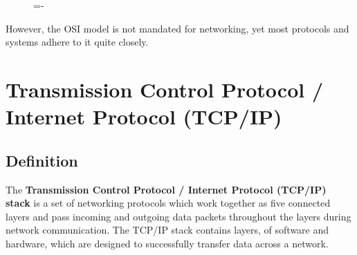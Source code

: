 \documentclass[a4paper]{systems-software}
\begin{document}
\begin{figure}[H]
	\lineskip=-\fboxrule
\end{figure}

However, the OSI model is not mandated for networking, yet most protocols and systems adhere to it quite closely. 


\section*{Transmission Control Protocol / Internet Protocol (TCP/IP)}

\subsection*{Definition}

The \textbf{Transmission Control Protocol / Internet Protocol (TCP/IP) stack} is a set of networking protocols which work together as five connected layers and pass incoming and outgoing data packets throughout the layers during network communication. The TCP/IP stack contains layers, of software and hardware, which are designed to successfully transfer data across a network.
\end{document}
